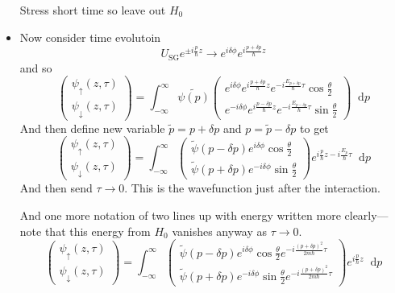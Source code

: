 \documentclass[11pt, a4paper]{article}
\newcommand{\diff}{\mathop{}\!\mathrm{d}} %
\newcommand{\ua}{\uparrow}  %
\newcommand{\da}{\downarrow}  %
\begin{document}
\begin{itemize}
    Stress short time so leave out $ H_{0} $
    \item Now consider time evolutoin
    \begin{equation*}
        U_{\text{SG}}e^{\pm i \frac{p}{\hbar}z} \to e^{i \delta\phi} e^{i \frac{p + \delta p }{\hbar}z}
    \end{equation*}
    and so
    \begin{equation*}
        \begin{pmatrix}
            \psi_{\ua}(z, \tau)\\
            \psi_{\da}(z, \tau)
        \end{pmatrix}
        = \int_{-\infty}^{\infty} \tilde{\psi(p)}
        \begin{pmatrix}
            e^{i \delta \phi} e^{i \frac{p + \delta p}{\hbar}z}e^{-i \frac{E_{p+ \delta p}}{\hbar}\tau} \cos \frac{\theta}{2}\\
            e^{-i \delta \phi} e^{i \frac{p - \delta p}{\hbar}z}e^{-i \frac{E_{p - \delta p}}{\hbar}\tau} \sin \frac{\theta}{2}
        \end{pmatrix}
        \diff p
    \end{equation*}
    And then define new variable $ \tilde{p} = p + \delta p $ and $ p = \tilde{p} - \delta p $ to get
    \begin{equation*}
        \begin{pmatrix}
            \psi_{\ua}(z, \tau)\\
            \psi_{\da}(z, \tau)
        \end{pmatrix}
        = \int_{-\infty}^{\infty}
        \begin{pmatrix}
            \tilde{\psi}(p - \delta p) e^{i \delta\phi} \cos \frac{\theta}{2}\\
            \tilde{\psi}(p + \delta p) e^{-i \delta\phi} \sin \frac{\theta}{2}
        \end{pmatrix}
        e^{i \frac{p}{\hbar}z - i \frac{E_{p}}{\hbar}\tau} \diff p
    \end{equation*}
    And then send $ \tau \to 0 $. This is the wavefunction just after the interaction. 

    And one more notation of two lines up with energy written more clearly---note that this energy from $ H_{0} $ vanishes anyway as $ \tau \to 0 $. 
    \begin{equation*}
        \begin{pmatrix}
            \psi_{\ua}(z, \tau)\\
            \psi_{\da}(z, \tau)
        \end{pmatrix}
        = \int_{-\infty}^{\infty}
        \begin{pmatrix}
            \tilde{\psi}(p - \delta p) e^{i \delta\phi} \cos \frac{\theta}{2} e^{- i \frac{(p + \delta p)^{2}}{2m \hbar}\tau}\\
            \tilde{\psi}(p + \delta p) e^{-i \delta\phi} \sin \frac{\theta}{2}e^{- i \frac{(p + \delta p)^{2}}{2m \hbar}\tau}
        \end{pmatrix}
        e^{i \frac{p}{\hbar}z} \diff p
    \end{equation*}
    

\end{itemize}
\end{document}
